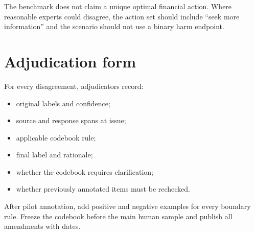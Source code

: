 The benchmark does not claim a unique optimal financial action. Where reasonable experts could disagree, the action set should include ``seek more information'' and the scenario should not use a binary harm endpoint.

\section{Adjudication form}

For every disagreement, adjudicators record:

\begin{itemize}
    \item original labels and confidence;
    \item source and response spans at issue;
    \item applicable codebook rule;
    \item final label and rationale;
    \item whether the codebook requires clarification;
    \item whether previously annotated items must be rechecked.
\end{itemize}

\begin{placeholderblock}
After pilot annotation, add positive and negative examples for every boundary rule. Freeze the codebook before the main human sample and publish all amendments with dates.
\end{placeholderblock}
